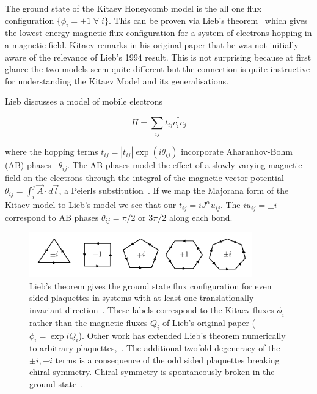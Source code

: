 The ground state of the Kitaev Honeycomb model is the all one flux configuration \(\{\phi_i = +1\; \forall \; i\}\). This can be proven via Lieb's theorem~\autocite{lieb_flux_1994} which gives the lowest energy magnetic flux configuration for a system of electrons hopping in a magnetic field. Kitaev remarks in his original paper that he was not initially aware of the relevance of Lieb's 1994 result. This is not surprising because at first glance the two models seem quite different but the connection is quite instructive for understanding the Kitaev Model and its generalisations.

Lieb discusses a model of mobile electrons

\[H = \sum_{ij} t_{ij} c^\dagger_i c_j\]

where the hopping terms \(t_{ij} = |t_{ij}|\exp(i\theta_{ij})\) incorporate Aharanhov-Bohm (AB) phases~\autocite{aharonovSignificanceElectromagneticPotentials1959} \(\theta_{ij}\). The AB phases model the effect of a slowly varying magnetic field on the electrons through the integral of the magnetic vector potential \(\theta_{ij} = \int_i^j \vec{A} \cdot d\vec{l}\), a Peierls substitution~\autocite{peierlsZurTheorieDiamagnetismus1933}. If we map the Majorana form of the Kitaev model to Lieb's model we see that our \(t_{ij} = i J^\alpha u_{ij}\). The \(i u_{ij} = \pm i\) correspond to AB phases \(\theta_{ij} = \pi/2\) or \(3\pi/2\) along each bond.

\hypertarget{fig:regular_plaquettes}{%
\begin{figure}
\centering
\includegraphics[width=0.86\textwidth,height=\textheight]{figure_code/amk_chapter/intro/regular_plaquettes/regular_plaquettes}
\caption[{Plaquettes in the Kitaev Model}]{Lieb's theorem gives the ground state flux configuration for even sided plaquettes in systems with at least one translationally invariant direction~\autocite{lieb_flux_1994}. These labels correspond to the Kitaev fluxes \(\phi_i\) rather than the magnetic fluxes \(Q_i\) of Lieb's original paper (\(\phi_i = \exp{iQ_i}\)). Other work has extended Lieb's theorem numerically to arbitrary plaquettes,~\autocite{eschmannThermodynamicClassificationThreedimensional2020,Yao2009,eschmann2019thermodynamics,Peri2020}. The additional twofold degeneracy of the \(\pm i, \mp i\) terms is a consequence of the odd sided plaquettes breaking chiral symmetry. Chiral symmetry is spontaneously broken in the ground state~\autocite{Yao2009}.}
\label{fig:regular_plaquettes}
\end{figure}
}

